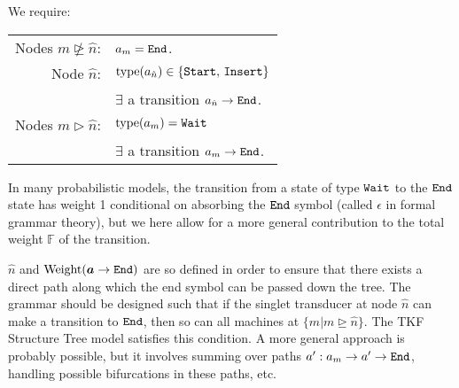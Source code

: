 \documentclass[10pt]{article}
\begin{document}
We require:

\begin{tabular}{rl}
  Nodes $m \ntrianglerighteq \hat{n}$: & $a_m = \mathtt{End}$. \\
  Node $\hat{n}$: & $\operatorname{type}(a_{\hat{n}}) \in \{\mathtt{Start},\,\mathtt{Insert}\}$ \\
  & $\exists$ a transition $a_{\hat{n}} \to \mathtt{End}$.  \\
  Nodes $m \vartriangleright \hat{n}$: & $\operatorname{type}(a_m) = \mathtt{Wait}$ \\
  & $\exists$ a transition $a_m \to \mathtt{End}$. \\
\end{tabular}

In many probabilistic models, the transition from a state of type $\mathtt{Wait}$ to the $\mathtt{End}$ state has weight 1 conditional on absorbing 
the $\mathtt{End}$ symbol (called $\epsilon$ in formal grammar theory),
but we here allow for a more general contribution to the total weight $\mathbb{F}$ of the transition.

$\hat{n}$ and $\operatorname{Weight}(\boldsymbol{a}\to\mathtt{End})$ are so defined in order to ensure that there exists a direct path
along which the end symbol can be passed down the tree.
The grammar should be designed such that if the singlet transducer at node $\hat{n}$ can make a transition to $\mathtt{End}$,
then so can all machines at $\{m|m \trianglerighteq \hat{n}\}$.
The TKF Structure Tree model satisfies this condition.
A more general approach is probably possible, but it involves summing over paths $a': a_m \to a' \to \mathtt{End}$,
handling possible bifurcations in these paths, etc.





\end{document}
